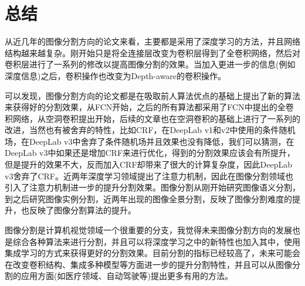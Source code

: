 \documentclass[cn]{elegantbook}
\begin{document}
\chapter{总结}
从近几年的图像分割方向的论文来看，主要都是采用了深度学习的方法，并且网络结构越来越复杂。刚开始只是将全连接层改变为卷积层得到了全卷积网络，然后对卷积层进行了一系列的修改以提高图像分割的效果。当加入更进一步的信息(例如深度信息)之后，卷积操作也改变为Depth-aware的卷积操作。

可以发现，图像分割方向的论文都是在吸取前人算法优点的基础上提出了新的算法来获得好的分割效果，从FCN开始，之后的所有算法都采用了FCN中提出的全卷积网络，从空洞卷积提出开始，后续的文章也在空洞卷积的基础上进行了一系列的改进，当然也有被舍弃的特性，比如CRF，在DeepLab v1和v2中使用的条件随机场，在DeepLab v3中舍弃了条件随机场并且效果也没有降低，我们可以猜测，在DeepLab v3中如果还是增加CRF来进行优化，得到的分割效果应该会有所提升，但是提升的效果不大，反而加入CRF却带来了很大的计算复杂度，因此DeepLab v3舍弃了CRF。近两年深度学习领域提出了注意力机制，因此在图像分割领域也引入了注意力机制进一步的提升分割效果。图像分割从刚开始研究图像语义分割，到之后研究图像实例分割，近两年出现的图像全景分割，反映了图像分割难度的提升，也反映了图像分割算法的提升。

图像分割是计算机视觉领域一个很重要的分支，我觉得未来图像分割方向的发展也是综合各种算法来进行分割，并且可以将深度学习之中的新特性也加入其中，使用集成学习的方式来获得更好的分割效果。目前分割的指标已经较高了，未来可能会在改变卷积结构、集成多种模型等方面进一步的提升分割特性，并且可以从图像分割的应用方面(如医疗领域、自动驾驶等)提出更多有用的方法。


\end{document}

